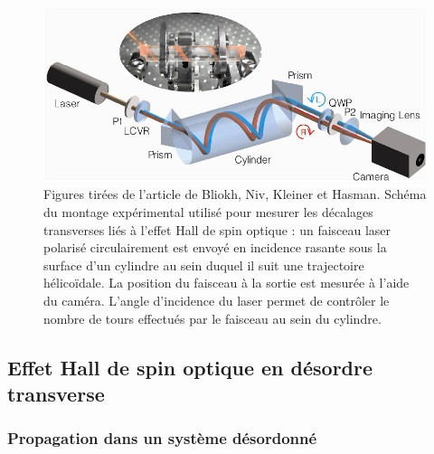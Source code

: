 \documentclass[a4paper,11pt]{article} %
\begin{document}
	\begin{figure}[h]
		\centering
		\begin{minipage}[c]{0.85\linewidth}
			\centering
			\includegraphics[width=0.9\linewidth]{./Illustrations/Bliokh_mesure_SHE-light-1.eps}
			\caption{Figures tirées de l'article de Bliokh, Niv, Kleiner et Hasman. Schéma du montage expérimental utilisé pour mesurer les décalages transverses liés à l'effet Hall de spin optique : un faisceau laser polarisé circulairement est envoyé en incidence rasante sous la surface d'un cylindre au sein duquel il suit une trajectoire hélicoïdale. La position du faisceau à la sortie est mesurée à l'aide du caméra. L'angle d'incidence du laser permet de contrôler le nombre de tours effectués par le faisceau au sein du cylindre.}
			\label{fig:mesure_SHE_light}
		\end{minipage}
	\end{figure}
	
	\subsection{Effet Hall de spin optique en désordre transverse}
	\subsubsection{Propagation dans un système désordonné}
	
\end{document}
